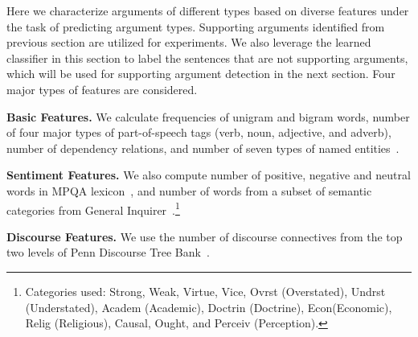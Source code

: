 


Here we characterize arguments of different types based on diverse features under the task of predicting argument types. Supporting arguments identified from previous section are utilized for experiments. We also leverage the learned classifier in this section to label the sentences that are not supporting arguments, which will be used for supporting argument detection in the next section. Four major types of features are considered.

\noindent \textbf{Basic Features.} We calculate frequencies of unigram and bigram words, number of four major types of part-of-speech tags (verb, noun, adjective, and adverb), number of dependency relations, and number of seven types of named entities~\cite{chinchor1997muc}.

\noindent \textbf{Sentiment Features.} We also compute number of positive, negative and neutral words in MPQA lexicon~\cite{wilson2005recognizing}, and number of words from a subset of semantic categories from General Inquirer~\cite{stone1966general}.\footnote{Categories used: Strong, Weak, Virtue, Vice, Ovrst (Overstated), Undrst (Understated), Academ (Academic), Doctrin (Doctrine), Econ\@ (Economic), Relig (Religious), Causal, Ought, and Perceiv (Perception).}

\noindent \textbf{Discourse Features.} We use the number of discourse connectives from the top two levels of Penn Discourse Tree Bank~\cite{prasad2007penn}.

